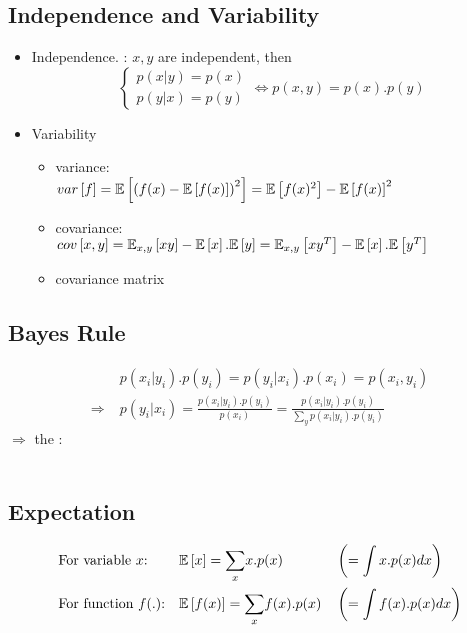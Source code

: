 \subsection{Independence and Variability}
\begin{itemize}
	\item Independence. \Eg: $x, y$ are independent, then
	\[\begin{cases}
		p(x|y) = p(x)\\
		p(y|x) = p(y)
	\end{cases}
	\iff p(x,y) = p(x).p(y)\]
	
	\item Variability
	\begin{itemize}
		\item variance:\\ $var \left[f\right] = \mathbb{E} \left[ \left(f(x)-\mathbb{E} \left[ f(x) \right]\right)^2 \right] = \mathbb{E} \left[ f(x)^2 \right] - \mathbb{E} \left[ f(x) \right]^2$
		\item covariance:\\ $cov \left[x, y\right] = \mathbb{E}_{x,y}\left[xy\right] - \mathbb{E} \left[ x \right].\mathbb{E} \left[ y \right] = \mathbb{E}_{x,y}\left[xy^T\right] - \mathbb{E} \left[ x \right].\mathbb{E} \left[ y^T \right]$
		\item covariance matrix
	\end{itemize}
\end{itemize}

\subsection{Bayes Rule}
\label{subsec:bayes-rule}
\begin{align*}
	& p(x_i|y_i).p(y_i) = p(y_i|x_i).p(x_i) = p(x_i, y_i) \\
	\Rightarrow\; &p(y_i|x_i) = \frac{p(x_i|y_i).p(y_i)}{p(x_i)} = \frac{p(x_i|y_i).p(y_i)}{\underset{y}{\sum} p(x_i|y_i).p(y_i)}
\end{align*}
$\Rightarrow$ the :\\~\\

\subsection{Expectation}
\label{subsec:expectation}
\begin{align*}
	& \text{For variable $x$:} && \mathbb{E} \left[ x \right] = \underset{x}{\sum}x.p(x) && \left( = \int x.p(x)dx \right)\\
	& \text{For function $f(.)$:} && \mathbb{E} \left[ f(x) \right] = \underset{x}{\sum}f(x).p(x) && \left( = \int f(x).p(x)dx \right)
\end{align*}

